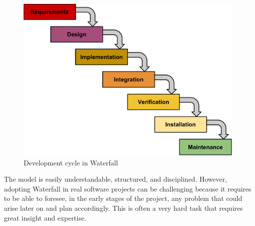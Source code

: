 \begin{figure}[h]
\begin{center}
\includegraphics[scale=0.6]{../Figures/Waterfall-model.pdf}
\end{center}
\caption{Development cycle in Waterfall}
\label{figure:waterfall-model}
\end{figure}

The model is easily understandable, structured, and disciplined.
However, adopting Waterfall in real software projects can be challenging because it requires to be able to foresee, in the early stages of the project, any problem that could arise later on and plan accordingly.
This is often a very hard task that requires great insight and expertise.


